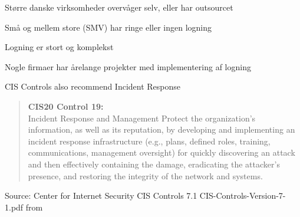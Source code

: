 \documentclass[Screen16to9,17pt]{foils}
\begin{document}
\begin{list2}
\item Større danske virksomheder overvåger selv, eller har outsourcet
\item Små og mellem store (SMV) har ringe eller ingen logning
\end{list2}




\begin{list2}
\item Logning er stort og komplekst
\item Nogle firmaer har årelange projekter med implementering af logning
\end{list2}

{ CIS Controls also recommend Incident Response}

\begin{quote}\small{\bf
CIS20 Control 19:}\\
Incident Response and Management Protect the organization’s information, as well as its reputation, by developing and implementing an incident response infrastructure (e.g., plans, defined roles, training, communications, management oversight) for quickly discovering an attack and then effectively containing the damage, eradicating the attacker’s presence, and restoring the integrity of the network and systems.
\end{quote}

Source:
Center for Internet Security CIS Controls 7.1 CIS-Controls-Version-7-1.pdf
from 
\end{document}

